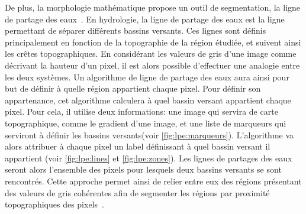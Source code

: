 \documentclass[\main/main.tex]{subfiles}
\begin{document}
%
De plus, la morphologie mathématique propose un outil de segmentation, la ligne de partage des eaux~\cite{meyer_1994}.
%
En hydrologie, la ligne de partage des eaux est la ligne permettant de séparer différents bassins versants.
%
Ces lignes sont définis principalement en fonction de la topographie de la région étudiée, et suivent ainsi les crêtes topographiques.
%
En considérant les valeurs de gris d'une image comme décrivant la hauteur d'un pixel,
il est alors possible d'effectuer une analogie entre les deux systèmes.
%
Un algorithme de ligne de partage des eaux aura ainsi pour but de définir à quelle région appartient chaque pixel.
%
Pour définir son appartenance,
cet algorithme calculera à quel bassin versant appartient chaque pixel.
%
Pour cela, il utilise deux informations: une image qui servira de carte topographique, comme le gradient d'une image, et une liste de marqueurs qui serviront à définir les bassins versants(voir \autoref{fig:lpe:marqueurs}).
%
L'algorithme va alors attribuer à chaque pixel un label définissant à quel bassin versant il appartient (voir \autoref{fig:lpe:lines} et \ref{fig:lpe:zones}).
%
Les lignes de partages des eaux seront alors l'ensemble des pixels pour lesquels deux bassins versants se sont rencontrés.
%
Cette approche permet ainsi de relier entre eux des régions présentant des valeurs de gris cohérentes afin de segmenter les régions par proximité topographiques des pixels~\cite{liang_2019,eschweiler_2019}.
%
\end{document}
